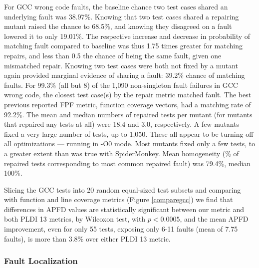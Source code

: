 For GCC wrong code faults, the baseline chance two test cases shared an underlying fault was 38.97\%.  Knowing that two test cases shared a repairing mutant raised the chance to 68.5\%, and knowing they disagreed on a fault lowered it to only 19.01\%.  The respective increase and decrease in probability of matching fault compared to baseline was thus 1.75 times greater for matching repairs, and less than 0.5 the chance of being the same fault, given one mismatched repair.  Knowing two test cases were both not fixed by a mutant again provided marginal evidence of sharing a fault: 39.2\% chance of matching faults.
For 99.3\% (all but 8) of the 1,090 non-singleton fault failures in GCC wrong code, the closest test case(s) by the repair metric matched fault.  The best previous reported FPF metric, function coverage vectors, had a matching rate of 92.2\%.   The mean and median numbers of repaired tests per mutant (for mutants that repaired any tests at all) were 18.4 and 3.0, respectively.  A few mutants fixed a very large number of tests, up to 1,050.  These all appear to be turning off all optimizations --- running in -O0 mode.  Most mutants fixed only a few tests, to a greater extent than was true with SpiderMonkey.    Mean homogeneity (\% of repaired tests corresponding to most common repaired fault) was 79.4\%, median 100\%.

Slicing the GCC tests into 20 random equal-sized test subsets and comparing with function and line coverage metrics (Figure \ref{comparegcc}) we find that differences in APFD values are statistically significant between our metric and both PLDI 13 metrics, by Wilcoxon test, with $p < 0.0005$, and the mean APFD improvement, even for only 55 tests, exposing only 6-11 faults (mean of 7.75 faults), is more than 3.8\% over either PLDI 13 metric.


\subsubsection{Fault Localization}

